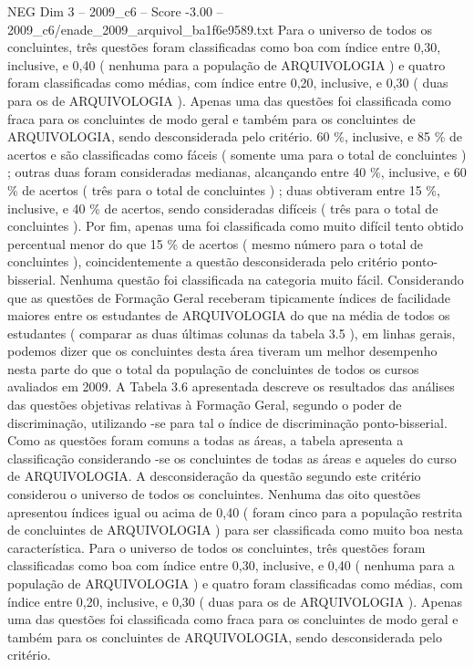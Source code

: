 \begin{textsample}{NEG Dim 3 – 2009\_c6 – Score -3.00 – 2009\_c6/enade\_2009\_arquivol\_ba1f6e9589.txt}
Para o universo de todos os concluintes, três questões foram classificadas como boa com índice entre 0,30, inclusive, e 0,40 ( nenhuma para a população de ARQUIVOLOGIA ) e quatro foram classificadas como médias, com índice entre 0,20, inclusive, e 0,30 ( duas para os de ARQUIVOLOGIA ).
Apenas uma das questões foi classificada como fraca para os concluintes de modo geral e também para os concluintes de ARQUIVOLOGIA, sendo desconsiderada pelo critério. 60 \%, inclusive, e 85 \% de acertos e são classificadas como fáceis ( somente uma para o total de concluintes ) ; outras duas foram consideradas medianas, alcançando entre 40 \%, inclusive, e 60 \% de acertos ( três para o total de concluintes ) ; duas obtiveram entre 15 \%, inclusive, e 40 \% de acertos, sendo consideradas difíceis ( três para o total de concluintes ).
Por fim, apenas uma foi classificada como muito difícil tento obtido percentual menor do que 15 \% de acertos ( mesmo número para o total de concluintes ), coincidentemente a questão desconsiderada pelo critério ponto-bisserial.
Nenhuma questão foi classificada na categoria muito fácil.
Considerando que as questões de Formação Geral receberam tipicamente índices de facilidade maiores entre os estudantes de ARQUIVOLOGIA do que na média de todos os estudantes ( comparar as duas últimas colunas da tabela 3.5 ), em linhas gerais, podemos dizer que os concluintes desta área tiveram um melhor desempenho nesta parte do que o total da população de concluintes de todos os cursos avaliados em 2009.
A Tabela 3.6 apresentada descreve os resultados das análises das questões objetivas relativas à Formação Geral, segundo o poder de discriminação, utilizando -se para tal o índice de discriminação ponto-bisserial.
Como as questões foram comuns a todas as áreas, a tabela apresenta a classificação considerando -se os concluintes de todas as áreas e aqueles do curso de ARQUIVOLOGIA.
A desconsideração da questão segundo este critério considerou o universo de todos os concluintes.
Nenhuma das oito questões apresentou índices igual ou acima de 0,40 ( foram cinco para a população restrita de concluintes de ARQUIVOLOGIA ) para ser classificada como muito boa nesta característica.
Para o universo de todos os concluintes, três questões foram classificadas como boa com índice entre 0,30, inclusive, e 0,40 ( nenhuma para a população de ARQUIVOLOGIA ) e quatro foram classificadas como médias, com índice entre 0,20, inclusive, e 0,30 ( duas para os de ARQUIVOLOGIA ).
Apenas uma das questões foi classificada como fraca para os concluintes de modo geral e também para os concluintes de ARQUIVOLOGIA, sendo desconsiderada pelo critério.

\end{textsample}
